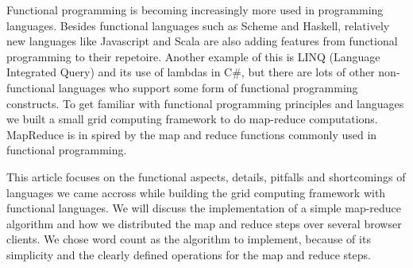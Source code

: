 Functional programming is becoming increasingly more used in programming
languages. Besides functional languages such as Scheme and Haskell, relatively
new languages like Javascript and Scala are also adding features from functional
programming to their repetoire. Another example of this is LINQ (Language
Integrated Query) and its use of lambdas in C\#, but there are lots of other
non-functional languages who support some form of functional programming
constructs. To get familiar with functional programming principles and languages
we built a small grid computing framework to do map-reduce computations.
MapReduce is in spired by the map and reduce functions commonly used in
functional programming.

This article focuses on the functional aspects, details, pitfalls and
shortcomings of languages we came accross while building the grid computing
framework with functional languages. We will discuss the implementation of a
simple map-reduce algorithm and how we distributed the map and reduce steps over
several browser clients. We chose word count as the algorithm to implement,
because of its simplicity and the clearly defined operations for the map and
reduce steps.
